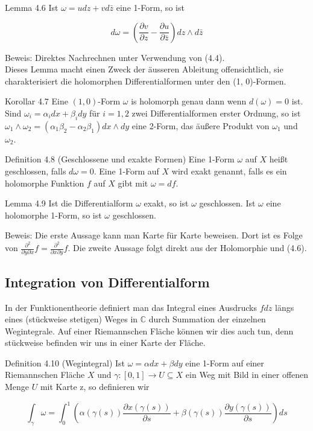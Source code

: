\documentclass[10pt, letterpaper]{article}
\begin{document}
Lemma 4.6 Ist $\omega=u d z+v d \bar{z}$ eine 1-Form, so ist

$$
d \omega=\left(\frac{\partial v}{\partial z}-\frac{\partial u}{\partial \bar{z}}\right) d z \wedge d \bar{z}
$$

Beweis: Direktes Nachrechnen unter Verwendung von (4.4).\\
Dieses Lemma macht einen Zweck der äusseren Ableitung offensichtlich, sie charakterisiert die holomorphen Differentialformen unter den (1, 0)-Formen.

Korollar 4.7 Eine $(1,0)$-Form $\omega$ is holomorph genau dann wenn $d(\omega)=0$ ist.\\
Sind $\omega_{i}=\alpha_{i} d x+\beta_{i} d y$ für $i=1,2$ zwei Differentialformen erster Ordnung, so ist $\omega_{1} \wedge \omega_{2}=\left(\alpha_{1} \beta_{2}-\alpha_{2} \beta_{1}\right) d x \wedge d y$ eine 2-Form, das äußere Produkt von $\omega_{1}$ und $\omega_{2}$.

Definition 4.8 (Geschlossene und exakte Formen) Eine 1-Form $\omega$ auf $X$ heißt geschlossen, falls $d \omega=0$. Eine 1-Form auf $X$ wird exakt genannt, falls es ein holomorphe Funktion $f$ auf $X$ gibt mit $\omega=d f$.

Lemma 4.9 Ist die Differentialform $\omega$ exakt, so ist $\omega$ geschlossen. Ist $\omega$ eine holomorphe 1-Form, so ist $\omega$ geschlossen.

Beweis: Die erste Aussage kann man Karte für Karte beweisen. Dort ist es Folge von $\frac{\partial^{2}}{\partial y \partial x} f=\frac{\partial^{2}}{\partial x \partial y} f$. Die zweite Aussage folgt direkt aus der Holomorphie und (4.6).

\subsection {Integration von Differentialform}
In der Funktionentheorie definiert man das Integral eines Ausdrucks $f d z$ längs eines (stückweise stetigen) Weges in $\mathbb{C}$ durch Summation der einzelnen Wegintegrale. Auf einer Riemannschen Fläche können wir dies auch tun, denn stückweise befinden wir uns in einer Karte der Fläche.

Definition 4.10 (Wegintegral) Ist $\omega=\alpha d x+\beta d y$ eine 1-Form auf einer Riemannschen Fläche $X$ und $\gamma:[0,1] \rightarrow U \subseteq X$ ein Weg mit Bild in einer offenen Menge $U$ mit Karte z, so definieren wir

$$
\int_{\gamma} \omega=\int_{0}^{1}\left(\alpha(\gamma(s)) \frac{\partial x(\gamma(s))}{\partial s}+\beta(\gamma(s)) \frac{\partial y(\gamma(s))}{\partial s}\right) d s
$$
\end{document}
